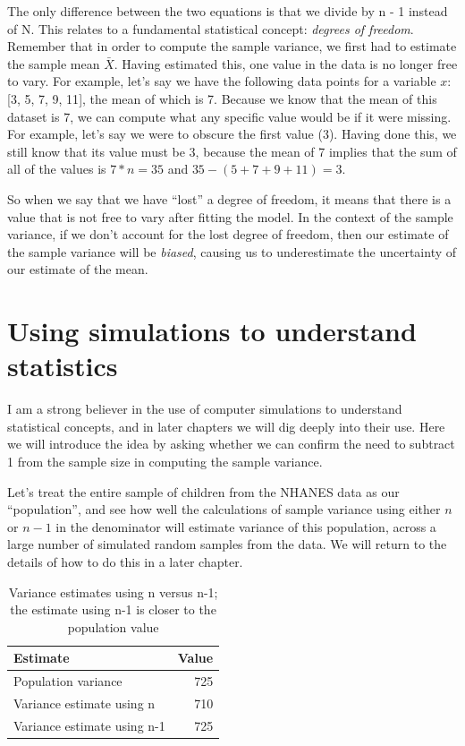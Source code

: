 \documentclass[12pt,]{book}
\theoremstyle{definition}
\theoremstyle{definition}
\theoremstyle{definition}
\theoremstyle{remark}
\begin{document}
The only difference between the two equations is that we divide by n - 1 instead of N. This relates to a fundamental statistical concept: \emph{degrees of freedom}. Remember that in order to compute the sample variance, we first had to estimate the sample mean \(\bar{X}\). Having estimated this, one value in the data is no longer free to vary. For example, let's say we have the following data points for a variable \(x\): {[}3, 5, 7, 9, 11{]}, the mean of which is 7. Because we know that the mean of this dataset is 7, we can compute what any specific value would be if it were missing. For example, let's say we were to obscure the first value (3). Having done this, we still know that its value must be 3, because the mean of 7 implies that the sum of all of the values is \(7 * n = 35\) and \(35 - (5 + 7 + 9 + 11) = 3\).

So when we say that we have ``lost'' a degree of freedom, it means that there is a value that is not free to vary after fitting the model. In the context of the sample variance, if we don't account for the lost degree of freedom, then our estimate of the sample variance will be \emph{biased}, causing us to underestimate the uncertainty of our estimate of the mean.

\hypertarget{using-simulations-to-understand-statistics}{%
\section{Using simulations to understand statistics}\label{using-simulations-to-understand-statistics}}

I am a strong believer in the use of computer simulations to understand statistical concepts, and in later chapters we will dig deeply into their use. Here we will introduce the idea by asking whether we can confirm the need to subtract 1 from the sample size in computing the sample variance.

Let's treat the entire sample of children from the NHANES data as our ``population'', and see how well the calculations of sample variance using either \(n\) or \(n-1\) in the denominator will estimate variance of this population, across a large number of simulated random samples from the data. We will return to the details of how to do this in a later chapter.

\begin{table}

\caption{\label{tab:unnamed-chunk-22}Variance estimates using n versus n-1; the estimate using n-1 is closer to the population value}
\centering
\begin{tabular}[t]{l|r}
\hline
Estimate & Value\\
\hline
Population variance & 725\\
\hline
Variance estimate using n & 710\\
\hline
Variance estimate using n-1 & 725\\
\hline
\end{tabular}
\end{table}
\end{document}
